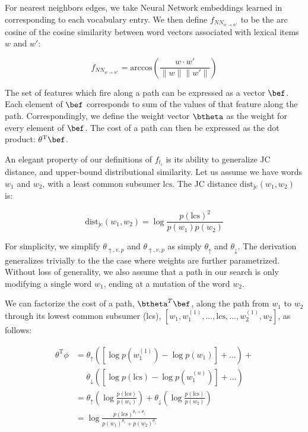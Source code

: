 For nearest neighbors edges, we take Neural Network embeddings learned
  in  corresponding to each vocabulary entry.
We then define $f_{NN_{w \rightarrow w'}}$
  to be the arc cosine of the cosine similarity between word vectors
  associated with lexical items $w$ and $w'$:

\begin{equation*}
  f_{NN_{w \rightarrow w'}}
    = \textrm{arccos} \left( \frac{w \cdot w'}{\|w\| \|w'\|} \right)
\end{equation*}

The set of features which fire along a path
  can be expressed as a vector $\bef$.
Each element of $\bef$ corresponds to sum of the values of that
  feature along the path.
Correspondingly, we define the weight vector $\btheta$ as the
  weight for every element of $\bef$.
The cost of a path can then be expressed as the dot product:
  $\theta^{\textrm{T}}\bef$.

%
%
An elegant property of our definitions of $f_{t_i}$ is its ability to
  generalize JC distance, and upper-bound distributional similarity.
Let us assume we have words $w_1$ and $w_2$, with a least common subsumer $\textrm{lcs}$.
The JC distance $\textrm{dist}_{\textrm{jc}}(w_1, w_2)$ is:

\begin{equation}
\textrm{dist}_{\textrm{jc}}(w_1, w_2)
  = \log\frac{p(\textrm{lcs})^2}{p(w_1)p(w_2)}
\label{eqn:jc}
\end{equation}

For simplicity, we simplify $\theta_{\uparrow,v,p}$ and $\theta_{\uparrow,v,p}$
  as simply $\theta_\uparrow$ and $\theta_\downarrow$.
The derivation generalizes trivially to the the case where weights are
  further parametrized.
Without loss of generality, we also assume that a path in our search
  is only modifying a single word $w_1$, ending at a mutation of the
  word $w_2$.

We can factorize the cost of a path, $\btheta^{T}\bef$, along the path
  from $w_1$ to $w_2$ through its lowest common subsumer (lcs),
  $[w_1, w_1^{(1)}, \dots, \textrm{lcs}, \dots,  w_2^{(1)}, w_2]$,
  as follows:

\begin{align*}
\theta^{\textrm{T}}\phi
  &= \theta_\uparrow \left( 
    \left[\log p(w_1^{(1)}) - \log p(w_1)\right] +
    \dots
    \right) + \\
  &~~~~~~ \theta_\downarrow \left( 
    \left[\log p(\textrm{lcs}) - \log p(w_1^{(n)}) \right] +
    \dots
    \right) \\
  &= \theta_\uparrow \left( \log \frac{p(\textrm{lcs})}{p(w_1)} \right) +
     \theta_\downarrow \left( \log \frac{p(\textrm{lcs})}{p(w_2)} \right) \\
  &= \log \frac{ p(\textrm{lcs})^{\theta_\uparrow + \theta_\downarrow} }
               { p(w_1)^{\theta_\uparrow} + p(w_2)^{\theta_\downarrow} }
\end{align*}

